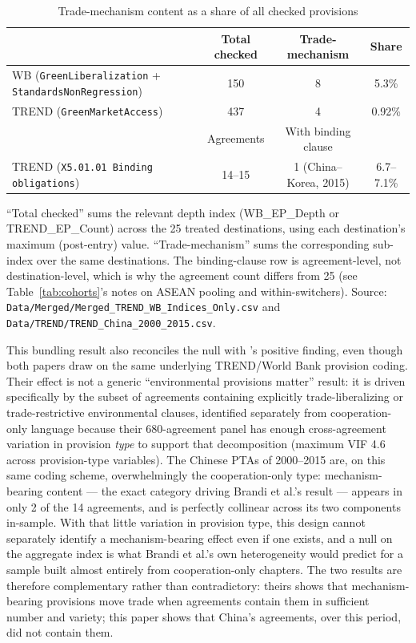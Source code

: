 \documentclass[12pt]{article}
\begin{document}
\begin{table}[htbp]
\centering
\caption{Trade-mechanism content as a share of all checked provisions}
\label{tab:mechanism-share}
\small
\begin{threeparttable}
\begin{tabular}{lccc}
\toprule
 & Total checked & Trade-mechanism & Share \\
\midrule
WB (\texttt{GreenLiberalization} + \texttt{StandardsNonRegression}) & 150 & 8 & 5.3\% \\
TREND (\texttt{GreenMarketAccess}) & 437 & 4 & 0.92\% \\
\midrule
 & Agreements & With binding clause & \\
\midrule
TREND (\texttt{X5.01.01 Binding obligations}) & 14--15 & 1 (China--Korea, 2015) & 6.7--7.1\% \\
\bottomrule
\end{tabular}
\begin{tablenotes}\footnotesize
\item ``Total checked'' sums the relevant depth index (WB\_EP\_Depth or
TREND\_EP\_Count) across the 25 treated destinations, using each destination's
maximum (post-entry) value. ``Trade-mechanism'' sums the corresponding sub-index over
the same destinations. The binding-clause row is agreement-level, not destination-level,
which is why the agreement count differs from 25 (see Table~\ref{tab:cohorts}'s notes on
ASEAN pooling and within-switchers). Source: \texttt{Data/Merged/Merged\_TREND\_WB\_Indices\_Only.csv}
and \texttt{Data/TREND/TREND\_China\_2000\_2015.csv}.
\end{tablenotes}
\end{threeparttable}
\end{table}

This bundling result also reconciles the null with \citet{brandi2020}'s positive finding,
even though both papers draw on the same underlying TREND/World Bank provision coding.
Their effect is not a generic ``environmental provisions matter'' result: it is driven
specifically by the subset of agreements containing explicitly trade-liberalizing or
trade-restrictive environmental clauses, identified separately from cooperation-only
language because their 680-agreement panel has enough cross-agreement variation in
provision \emph{type} to support that decomposition (maximum VIF 4.6 across
provision-type variables). The Chinese PTAs of 2000--2015 are, on this same coding
scheme, overwhelmingly the cooperation-only type: mechanism-bearing content --- the exact
category driving Brandi et al.'s result --- appears in only 2 of the 14 agreements, and
is perfectly collinear across its two components in-sample. With that little variation in
provision type, this design cannot separately identify a mechanism-bearing effect even if
one exists, and a null on the aggregate index is what Brandi et al.'s own heterogeneity
would predict for a sample built almost entirely from cooperation-only chapters. The two
results are therefore complementary rather than contradictory: theirs shows that
mechanism-bearing provisions move trade when agreements contain them in sufficient
number and variety; this paper shows that China's agreements, over this period, did not
contain them.
\end{document}
